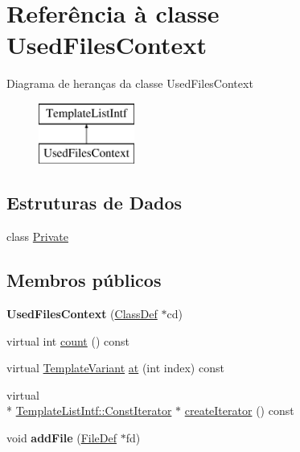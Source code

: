 \hypertarget{class_used_files_context}{\section{Referência à classe Used\-Files\-Context}
\label{class_used_files_context}
}
Diagrama de heranças da classe Used\-Files\-Context\begin{figure}[H]
\begin{center}
\leavevmode
\includegraphics[height=2.000000cm]{class_used_files_context}
\end{center}
\end{figure}
\subsection*{Estruturas de Dados}
\begin{DoxyCompactItemize}
\item 
class \hyperlink{class_used_files_context_1_1_private}{Private}
\end{DoxyCompactItemize}
\subsection*{Membros públicos}
\begin{DoxyCompactItemize}
\item 
\hypertarget{class_used_files_context_a37cb2763a8d7506bcb091a60a1c21259}{{\bfseries Used\-Files\-Context} (\hyperlink{class_class_def}{Class\-Def} $\ast$cd)}\label{class_used_files_context_a37cb2763a8d7506bcb091a60a1c21259}

\item 
virtual int \hyperlink{class_used_files_context_a0745638c9967e2ed90bc96c012288c55}{count} () const 
\item 
virtual \hyperlink{class_template_variant}{Template\-Variant} \hyperlink{class_used_files_context_a55f90d50fcb1378b2a97b9c3ad5bb162}{at} (int index) const 
\item 
virtual \\*
\hyperlink{class_template_list_intf_1_1_const_iterator}{Template\-List\-Intf\-::\-Const\-Iterator} $\ast$ \hyperlink{class_used_files_context_a0b1d6dedc3f51750e5cba18f51022f10}{create\-Iterator} () const 
\item 
\hypertarget{class_used_files_context_af3efe9b1bf1318fd627ece0d7e8bac04}{void {\bfseries add\-File} (\hyperlink{class_file_def}{File\-Def} $\ast$fd)}\label{class_used_files_context_af3efe9b1bf1318fd627ece0d7e8bac04}

\end{DoxyCompactItemize}



